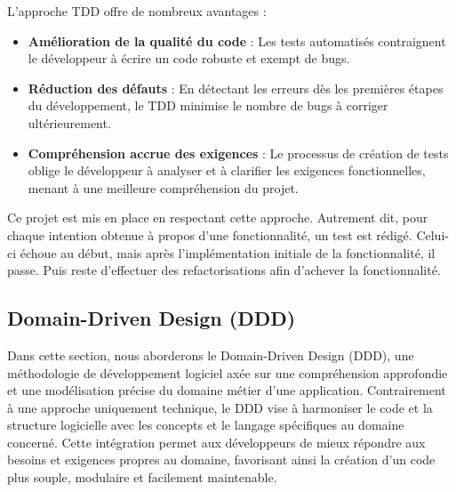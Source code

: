 L'approche TDD offre de nombreux avantages :
\begin{itemize}
    \item \textbf{Amélioration de la qualité du code} : Les tests automatisés contraignent le développeur à écrire un code robuste et exempt de bugs.

    \item \textbf{Réduction des défauts} : En détectant les erreurs dès les premières étapes du développement, le TDD minimise le nombre de bugs à corriger ultérieurement.

    \item \textbf{Compréhension accrue des exigences} : Le processus de création de tests oblige le développeur à analyser et à clarifier les exigences fonctionnelles, menant à une meilleure compréhension du projet.
\end{itemize}

Ce projet est mis en place en respectant cette approche. Autrement dit, pour chaque intention obtenue à propos d’une fonctionnalité, un test est rédigé. Celui-ci échoue au début, mais après l’implémentation initiale de la fonctionnalité, il passe. Puis reste d’effectuer des refactorisations afin d’achever la fonctionnalité.



\subsection{Domain-Driven Design (DDD)}

Dans cette section, nous aborderons le Domain-Driven Design (DDD), une méthodologie de développement logiciel axée sur une compréhension approfondie et une modélisation précise du domaine métier d'une application. Contrairement à une approche uniquement technique, le DDD vise à harmoniser le code et la structure logicielle avec les concepts et le langage spécifiques au domaine concerné. Cette intégration permet aux développeurs de mieux répondre aux besoins et exigences propres au domaine, favorisant ainsi la création d'un code plus souple, modulaire et facilement maintenable.





